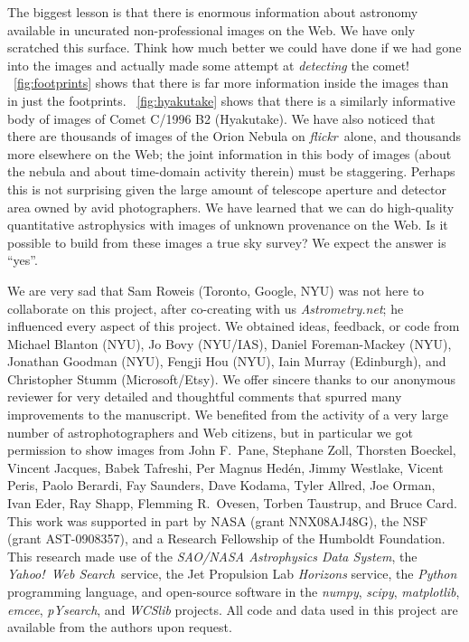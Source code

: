 \documentclass[12pt,preprint]{aastex}
\newcommand{\project}[1]{\textsl{#1}}
\newcommand{\An}{\project{Astrometry.net}}
\newcommand{\flickr}{\project{flickr}}
\newcommand{\yahoo}{Yahoo!}
\newcommand{\YWS}{\project{\yahoo\ Web Search}}
\newcommand{\figref}[1]{\figurename~\ref{#1}}
\begin{document}
The biggest lesson is that there is enormous information about
astronomy available in uncurated non-professional images on the Web.
We have only scratched this surface.  Think how much better we could
have done if we had gone into the images and actually made some
attempt at \emph{detecting} the comet!  \figref{fig:footprints} shows
that there is far more information inside the images than in just the
footprints.  \figref{fig:hyakutake} shows that there is a similarly
informative body of images of Comet C/1996 B2 (Hyakutake).  We have
also noticed that there are thousands of images of the Orion Nebula on
\flickr\ alone, and thousands more elsewhere on the Web; the joint
information in this body of images (about the nebula and about
time-domain activity therein) must be staggering.  Perhaps this is not
surprising given the large amount of telescope aperture and detector
area owned by avid photographers.  We have learned that we can do
high-quality quantitative astrophysics with images of unknown
provenance on the Web.  Is it possible to build from these images a
true sky survey?  We expect the answer is ``yes''.

\acknowledgements We are very sad that Sam Roweis (Toronto, Google,
NYU) was not here to collaborate on this project, after co-creating
with us \An; he influenced every aspect of this project.  We obtained
ideas, feedback, or code from Michael Blanton (NYU), Jo Bovy
(NYU/IAS), Daniel Foreman-Mackey (NYU), Jonathan Goodman (NYU), Fengji
Hou (NYU), Iain Murray (Edinburgh), and Christopher Stumm
(Microsoft/Etsy).  We offer sincere thanks to our anonymous reviewer
for very detailed and thoughtful comments that spurred many
improvements to the manuscript.  We benefited from the activity of a
very large number of astrophotographers and Web citizens, but in
particular we got permission to show images from John F.~Pane,
Stephane Zoll, Thorsten Boeckel, Vincent Jacques, Babek Tafreshi, Per
Magnus Hed\'en, Jimmy Westlake, Vicent Peris, Paolo Berardi, Fay
Saunders, Dave Kodama, Tyler Allred, Joe Orman, Ivan Eder, Ray Shapp,
Flemming R.~Ovesen, Torben Taustrup, and Bruce Card.  This work was
supported in part by NASA (grant NNX08AJ48G), the NSF (grant
AST-0908357), and a Research Fellowship of the Humboldt Foundation.
This research made use of the \project{SAO/NASA Astrophysics Data
  System}, the \YWS\ service, the Jet Propulsion Lab
\project{Horizons} service, the \project{Python} programming language,
and open-source software in the \project{numpy}, \project{scipy},
\project{matplotlib}, \project{emcee}, \project{pYsearch}, and
\project{WCSlib} projects.  All code and data used in this project are
available from the authors upon request.
\end{document}
